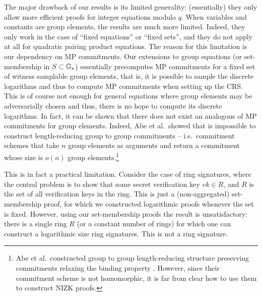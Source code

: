 The major drawback of our results is its limited generality: (essentially) they only allow more efficient proofs for integer equations modulo $q$. When variables and constants are group elements, the results are much more limited. Indeed, they only work in the case of ``fixed equations'' or ``fixed sets'', and they do not apply at all for quadratic pairing product equations. The reason for this limitation is our dependency on MP commitments. Our extensions to group equations (or set-membership in $S\subset\mathbb{G}_s$) essentially precomputes MP commitments for a fixed set of witness samplable group elements, that is, it is possible to sample the discrete logarithms and thus to compute MP commitments when setting up the CRS. This is of course not enough for general equations where group elements may be adversarially chosen and thus, there is no hope to compute its discrete logarithms. In fact, it can be shown that there does not exist an analogous of MP commitments for group elements. Indeed, Abe et al.~showed that is impossible to construct length-reducing group to group commitments \cite{EC:AbeHarOhk12} -- i.e.~commitment schemes that take $n$ group elements as arguments and return a commitment whose size is $o(n)$ group elements.\footnote{Abe et al.~constructed group to group length-reducing structure preserving commitments relaxing the binding property \cite{EC:AKOT15}. However, since their commitment scheme is not homomorphic, it is far from clear how to use them to construct NIZK proofs.} 

This is in fact a practical limitation. Consider the case of ring signatures, where the central problem is to show that some secret verification key $vk\in R$, and $R$ is the set of all verification keys in the ring. This is just a (non-aggregated) set-membership proof, for which we constructed logarithmic proofs whenever the set is fixed. However, using our set-membership proofs the result is unsatisfactory: there is a single ring $R$ (or a constant number of rings) for which one can construct a logarithmic size ring signatures. This is not a ring signature.

